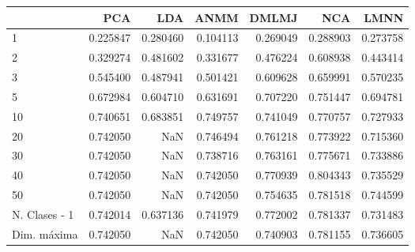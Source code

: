 \begin{tabular}{lrrrrrr}
\toprule
{} &       PCA &       LDA &      ANMM &     DMLMJ &       NCA &      LMNN \\
\midrule
1             &  0.225847 &  0.280460 &  0.104113 &  0.269049 &  0.288903 &  0.273758 \\
2             &  0.329274 &  0.481602 &  0.331677 &  0.476224 &  0.608938 &  0.443414 \\
3             &  0.545400 &  0.487941 &  0.501421 &  0.609628 &  0.659991 &  0.570235 \\
5             &  0.672984 &  0.604710 &  0.631691 &  0.707220 &  0.751447 &  0.694781 \\
10            &  0.740651 &  0.683851 &  0.749757 &  0.741049 &  0.770757 &  0.727933 \\
20            &  0.742050 &       NaN &  0.746494 &  0.761218 &  0.773922 &  0.715360 \\
30            &  0.742050 &       NaN &  0.738716 &  0.763161 &  0.775671 &  0.733886 \\
40            &  0.742050 &       NaN &  0.742050 &  0.770939 &  0.804343 &  0.735529 \\
50            &  0.742050 &       NaN &  0.742050 &  0.754635 &  0.781518 &  0.744599 \\
N. Clases - 1 &  0.742014 &  0.637136 &  0.741979 &  0.772002 &  0.781337 &  0.731483 \\
Dim. máxima   &  0.742050 &       NaN &  0.742050 &  0.740903 &  0.781155 &  0.736605 \\
\bottomrule
\end{tabular}
